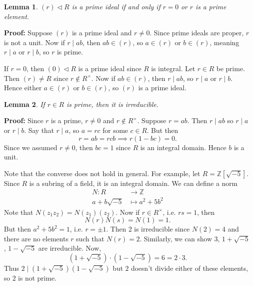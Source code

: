 \documentclass[12pt]{article}
\newtheorem{lemma}{Lemma}[section]
\theoremstyle{definition}
\theoremstyle{remark}
\begin{document}
\begin{lemma}
	$(r) \lhd R$ is a prime ideal if and only if $r = 0$ or $r$ is a prime element.
\end{lemma}

\begin{adjustbox}{minipage = \columnwidth - 25.5pt, margin=1em, frame=1pt, margin=0em}
	\textbf{Proof:} Suppose $(r)$ is a prime ideal and $r \neq 0$. Since prime ideals are proper, $r$ is not a unit. Now if $r \mid ab$, then $ab \in (r)$, so $a \in (r)$ or $b \in (r)$, meaning $r \mid a$ or $r \mid b$, so $r$ is prime.

	If $r = 0$, then $(0) \lhd R$ is a prime ideal since $R$ is integral. Let $r \in R$ be prime. Then $(r) \neq R$ since $r \not \in R^{\times}$. Now if $ab \in (r)$, then $r \mid ab$, so $r \mid a$ or $r \mid b$. Hence either $a \in (r)$ or $b \in (r)$, so $(r)$ is a prime ideal.
\end{adjustbox}

\begin{lemma}
	If $r \in R$ is prime, then it is irreducible.
\end{lemma}

\begin{adjustbox}{minipage = \columnwidth - 25.5pt, margin=1em, frame=1pt, margin=0em}
\textbf{Proof:} Since $r$ is a prime, $r \neq 0$ and $r \not \in R^{\times}$. Suppose $r = ab$. Then $r \mid ab$ so $r \mid a$ or $r \mid b$. Say that $r \mid a$, so $a = rc$ for some $c \in R$. But then
\[
	r = ab = rcb \implies r(1 - bc) = 0
.\]
Since we assumed $r \neq 0$, then $bc = 1$ since $R$ is an integral domain. Hence $b$ is a unit.
\end{adjustbox}

Note that the converse does not hold in general. For example, let $R = \mathbb{Z}[\sqrt{-5}]$. Since $R$ is a subring of a field, it is an integral domain. We can define a norm
\begin{align*}
	N : R &\to \mathbb{Z} \\
	a + b \sqrt{-5} &\mapsto a^2 + 5b^2
\end{align*}
Note that $N(z_1z_2) = N(z_1)(z_2)$. Now if $r \in R^{\times}$, i.e. $rs = 1$, then
\[
	N(r)N(s) = N(1) = 1
.\]
But then $a^2 + 5b^2 = 1$, i.e. $r = \pm 1$. Then 2 is irreducible since $N(2) = 4$ and there are no elements $r$ such that $N(r) = 2$. Similarly, we can show $3$, $1 + \sqrt{-5}$, $1 - \sqrt{-5}$ are irreducible. Now,
\[
	 (1 + \sqrt{-5}) \cdot (1 - \sqrt{-5}) = 6 = 2 \cdot 3
.\]
Thus $2 \mid (1 + \sqrt{-5})(1 - \sqrt{-5})$ but $2$ doesn't divide either of these elements, so $2$ is not prime.
\end{document}
